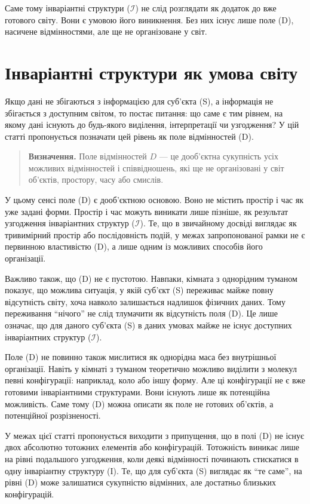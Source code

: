 \documentclass[aps,prd,onecolumn,nofootinbib,superscriptaddress]{revtex4-2} %
\begin{document}
    Саме тому інваріантні структури ($\mathcal{I}$) не слід розглядати як додаток до вже готового світу. Вони є умовою його виникнення. Без них існує лише поле (D), насичене відмінностями, але ще не організоване у світ.


    \section{Інваріантні структури як умова світу}
    Якщо дані не збігаються з інформацією для суб’єкта (S), а інформація не збігається з доступним світом, то постає питання: що саме є тим рівнем, на якому дані існують до будь-якого виділення, інтерпретації чи узгодження? У цій статті пропонується позначати цей рівень як поле відмінностей (D).

    \begin{quote}
        \textbf{Визначення.}
        Поле відмінностей \(D\) — це дооб’єктна сукупність усіх можливих відмінностей і співвідношень, які ще не організовані у світ об’єктів, простору, часу або смислів.
    \end{quote}

    У цьому сенсі поле (D) є дооб’єктною основою. Воно не містить простір і час як уже задані форми. Простір і час можуть виникати лише пізніше, як результат узгодження інваріантних структур ($\mathcal{I}$). Те, що в звичайному досвіді виглядає як тривимірний простір або послідовність подій, у межах запропонованої рамки не є первинною властивістю (D), а лише одним із можливих способів його організації.

    Важливо також, що (D) не є пустотою. Навпаки, кімната з однорідним туманом показує, що можлива ситуація, у якій суб’єкт (S) переживає майже повну відсутність світу, хоча навколо залишається надлишок фізичних даних. Тому переживання “нічого” не слід тлумачити як відсутність поля (D). Це лише означає, що для даного суб’єкта (S) в даних умовах майже не існує доступних інваріантних структур ($\mathcal{I}$).

    Поле (D) не повинно також мислитися як однорідна маса без внутрішньої організації. Навіть у кімнаті з туманом теоретично можливо виділити з молекул певні конфігурації: наприклад, коло або іншу форму. Але ці конфігурації не є вже готовими інваріантними структурами. Вони існують лише як потенційна можливість. Саме тому (D) можна описати як поле не готових об’єктів, а потенційної розрізненості.

    У межах цієї статті пропонується виходити з припущення, що в полі (D) не існує двох абсолютно тотожних елементів або конфігурацій. Тотожність виникає лише на рівні подальшого узгодження, коли деякі відмінності починають стискатися в одну інваріантну структуру (I). Те, що для суб’єкта (S) виглядає як “те саме”, на рівні (D) може залишатися сукупністю відмінних, але достатньо близьких конфігурацій.
\end{document}
